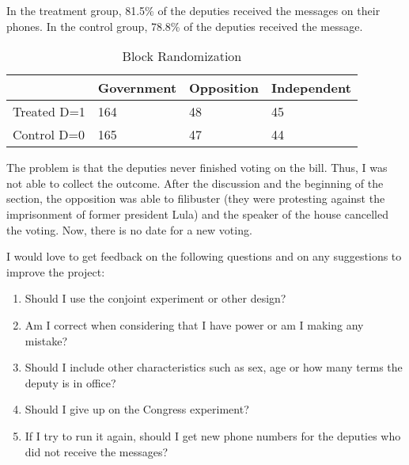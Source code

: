 \documentclass[12pt,a4paper]{article}
\begin{document}
In the treatment group, 81.5\% of the deputies received the messages on their phones. In the control group, 78.8\% of the deputies received the message. 

\begin{table}[]
\centering
\caption{ Block Randomization}
\label{my-label}
\begin{tabular}{|l|l|l|l|}
\hline
            & Government & Opposition & Independent \\ \hline
Treated D=1 & 164        & 48         & 45          \\ \hline
Control D=0 & 165        & 47         & 44          \\ \hline
\end{tabular}
\end{table}


The problem is that the deputies never finished voting on the bill. Thus, I was not able to collect the outcome. After the discussion and the beginning of the section, the opposition was able to filibuster (they were protesting against the imprisonment of former president Lula) and the speaker of the house cancelled the voting. Now, there is no date for a new voting.

I would love to get feedback on the following questions and on any suggestions to improve the project:

\begin{enumerate}
    	\item Should I use the conjoint experiment or other design?
    		\item Am I correct when considering that I have power or am I making any mistake?
    		\item Should I include other characteristics such as sex, age or how many terms the deputy is in office?
    		\item Should I give up on the Congress experiment?
    		\item If I try to run it again, should I get new phone numbers for the deputies who did not receive the messages? 
    
    \end{enumerate}
\end{document}
